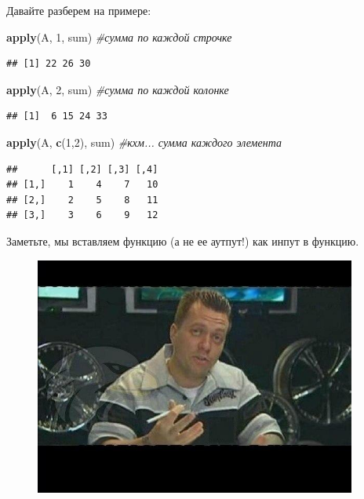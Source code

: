 \documentclass[]{book}
\newenvironment{Shaded}{\begin{snugshade}}{\end{snugshade}}
\newcommand{\KeywordTok}[1]{\textcolor[rgb]{0.13,0.29,0.53}{\textbf{#1}}}
\newcommand{\DecValTok}[1]{\textcolor[rgb]{0.00,0.00,0.81}{#1}}
\newcommand{\CommentTok}[1]{\textcolor[rgb]{0.56,0.35,0.01}{\textit{#1}}}
\newcommand{\NormalTok}[1]{#1}
\begin{document}
Давайте разберем на примере:

\begin{Shaded}
\begin{Highlighting}[]
\KeywordTok{apply}\NormalTok{(A, }\DecValTok{1}\NormalTok{, sum) }\CommentTok{#сумма по каждой строчке}
\end{Highlighting}
\end{Shaded}

\begin{verbatim}
## [1] 22 26 30
\end{verbatim}

\begin{Shaded}
\begin{Highlighting}[]
\KeywordTok{apply}\NormalTok{(A, }\DecValTok{2}\NormalTok{, sum) }\CommentTok{#сумма по каждой колонке}
\end{Highlighting}
\end{Shaded}

\begin{verbatim}
## [1]  6 15 24 33
\end{verbatim}

\begin{Shaded}
\begin{Highlighting}[]
\KeywordTok{apply}\NormalTok{(A, }\KeywordTok{c}\NormalTok{(}\DecValTok{1}\NormalTok{,}\DecValTok{2}\NormalTok{), sum) }\CommentTok{#кхм... сумма каждого элемента}
\end{Highlighting}
\end{Shaded}

\begin{verbatim}
##      [,1] [,2] [,3] [,4]
## [1,]    1    4    7   10
## [2,]    2    5    8   11
## [3,]    3    6    9   12
\end{verbatim}

Заметьте, мы вставляем функцию (а не ее аутпут!) как инпут в функцию.

\begin{figure}
\centering
\includegraphics[width=4.16667in]{images/monitor.jpg}
\caption{}
\end{figure}
\end{document}
